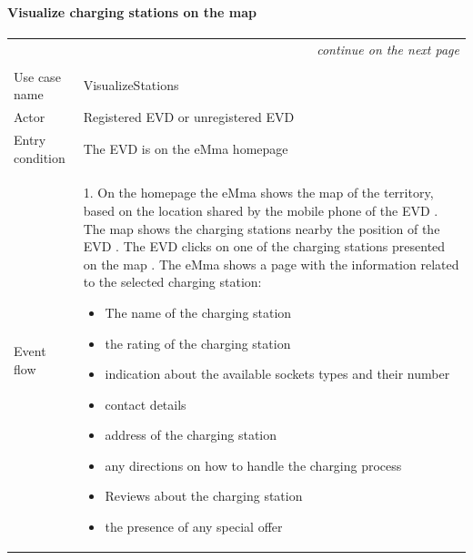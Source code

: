 \paragraph{Visualize charging stations on the map}
\begin{center}
    \begin{longtable}{p{4cm} p{11cm}}
    \multicolumn{2}{r}{\itshape{continue on the next page}}\\
    \endfoot 
    \\
    \endlastfoot
    \hline
     Use case name &  VisualizeStations\\
     \hline
     Actor & Registered EVD or unregistered EVD \\
     \hline
     Entry condition & The EVD is on the eMma homepage \\
     \hline
     Event flow &   1. On the homepage the eMma shows the map of the territory, based on the location shared                by the mobile phone of the EVD \newline
                    2. The map shows the charging stations nearby the position of the EVD \newline
                    3. The EVD clicks on one of the charging stations presented on the map \newline
                    4. The eMma shows a page with the information related to the selected charging station:
                    \begin{adjustwidth}{0.5cm}{}
                        \begin{itemize}
                                \item The name of the charging station
                                \item the rating of the charging station
                                \item indication about the available sockets types and their number
                                \item contact details
                                \item address of the charging station
                                \item any directions on how to handle the charging process
                                \item Reviews about the charging station
                                \item the presence of any special offer
                        \end{itemize}

\end{adjustwidth}
\end{longtable}
\end{center}
